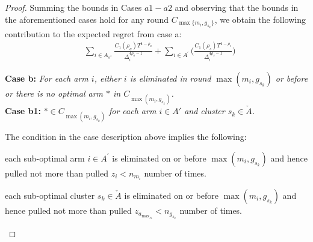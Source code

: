 \begin{proof}
Summing the bounds in Cases $a1-a2$ and observing that the bounds in the aforementioned cases hold for any round $C_{\max \lbrace m_i,g_{s_k}\rbrace}$, we obtain the following contribution to the expected regret from case a:
\begin{align*}
&\sum_{i\in A_{s^*}} \frac{C_{1}(\rho_{a})T^{1-\rho_{a}}}{\Delta_{i}^{4\rho_{a}-1}} + \sum_{i\in A^{'}}\bigg(\frac{C_{1}(\rho_{s})T^{1-\rho_{s}}}{\Delta_{i}^{4\rho_{s}-1}}\bigg)
\end{align*}


\textbf{Case b:} \textit{For each arm $i$, either ${i}$ is eliminated in round $\max (m_{i},g_{s_{k}})$ or before or there is no optimal arm ${*}$ in $C_{\max(m_{i},g_{s_{k}})}$.} \\

\textbf{Case b1:} \textit{${*}\in C_{\max(m_{i},g_{s_{k}})}$ for each arm $i \in A'$ and cluster $s_k \in \check A$.} 


The condition in the case description above implies the following: \\
\begin{inparaenum}[\bfseries (i)]
\item each sub-optimal arm ${i}\in A^{'}$ is  eliminated on or before $\max (m_{i},g_{s_{k}})$ and hence  pulled not more than pulled $z_i < n_{m_{i}}$ number of times.\\
\item each sub-optimal cluster $s_k \in \check A$ is  eliminated on or before $\max (m_{i},g_{s_{k}})$ and hence  pulled not more than pulled $z_{a_{\max_{s_{k}}}} < n_{g_{s_{k}}}$ number of times.
\end{inparaenum}


\end{proof}
